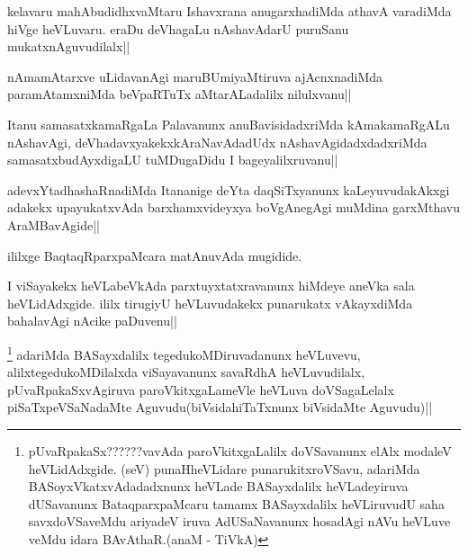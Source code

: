 
\begin{artha}
kelavaru mahAbudidhxvaMtaru Ishavxrana anugarxhadiMda athavA varadiMda hiVge heVLuvaru. eraDu deVhagaLu nAshavAdarU puruSanu mukatxnAguvudilalx||
\end{artha}


\begin{artha}
nAmamAtarxve uLidavanAgi maruBUmiyaMtiruva ajAcnxnadiMda paramAtamxniMda beVpaRTuTx 
aMtarALadalilx nilulxvanu||
\end{artha}

\begin{artha}
Itanu samasatxkamaRgaLa Palavanunx anuBavisidadxriMda kAmakamaRgALu nAshavAgi, deVhadavxyakekxkAraNavAdadUdx nAshavAgidadxdadxriMda samasatxbudAyxdigaLU tuMDugaDidu  I bageyalilxruvanu||
\end{artha}

\begin{artha}
adevxYtadhashaRnadiMda Itananige deYta daqSiTxyanunx kaLeyuvudakAkxgi adakekx upayukatxvAda barxhamxvideyxya boVgAnegAgi muMdina garxMthavu AraMBavAgide||
\end{artha}

\begin{center}
ililxge BaqtaqRparxpaMcara matAnuvAda mugidide.
\end{center}


\begin{artha}
I viSayakekx heVLabeVkAda parxtuyxtatxravanunx hiMdeye aneVka sala heVLidAdxgide. ililx 
tirugiyU heVLuvudakekx punarukatx vAkayxdiMda bahalavAgi nAcike paDuvenu||
\end{artha}
	
\begin{artha}
\footnote{pUvaRpakaSx??????vavAda paroVkitxgaLalilx doVSavanunx elAlx modaleV heVLidAdxgide. (seV) punaHheVLidare punarukitxroVSavu, adariMda BASoyxVkatxvAdadadxnunx heVLade BASayxdalilx heVLadeyiruva dUSavanunx BataqparxpaMcaru tamamx BASayxdalilx heVLiruvudU saha savxdoVSaveMdu ariyadeV iruva AdUSaNavanunx hosadAgi nAVu heVLuve veMdu idara BAvAthaR.(anaM - TiVkA)} adariMda BASayxdalilx tegedukoMDiruvadanunx heVLuvevu, alilxtegedukoMDilalxda viSayavanunx savaRdhA heVLuvudilalx, pUvaRpakaSxvAgiruva paroVkitxgaLameVle heVLuva doVSagaLelalx piSaTxpeVSaNadaMte Aguvudu(biVsidahiTaTxnunx biVsidaMte Aguvudu)||
\end{artha}


